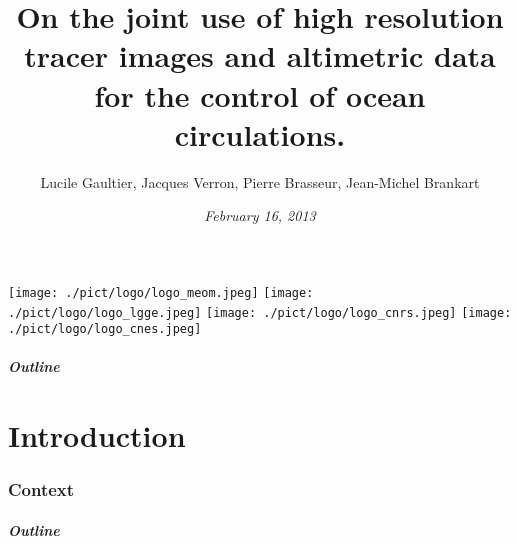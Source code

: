 \documentclass[compress,slidescentered,notes=show]{beamer}
\title{On the joint use of high resolution tracer images \hspace{4cm} and altimetric data for the control of ocean circulations.}
\author[LPO]{Lucile Gaultier, Jacques Verron, Pierre Brasseur, Jean-Michel Brankart}
\date{\textit{February 16, 2013}}
\begin{document}
\begin{frame}
  \maketitle
{}
  \begin{center}
    \texttt{[image: ./pict/logo/logo\_meom.jpeg]}
    \hspace{0.5cm}
    \texttt{[image: ./pict/logo/logo\_lgge.jpeg]}
    \hspace{0.5cm}
    \texttt{[image: ./pict/logo/logo\_cnrs.jpeg]}
    \hspace{0.5cm}
    \texttt{[image: ./pict/logo/logo\_cnes.jpeg]}
  \end{center}

  \note{
}
\end{frame}

\logo{\insertframenumber/\inserttotalframenumber}
\begin{frame}
  \frametitle{Outline}
  \tableofcontents[hideallsubsections]
\end{frame}

\part{Introduction}
\section{Context}%
\begin{frame}
  \frametitle{Outline}
  \tableofcontents[currentsection]
\end{frame}
\end{document}
